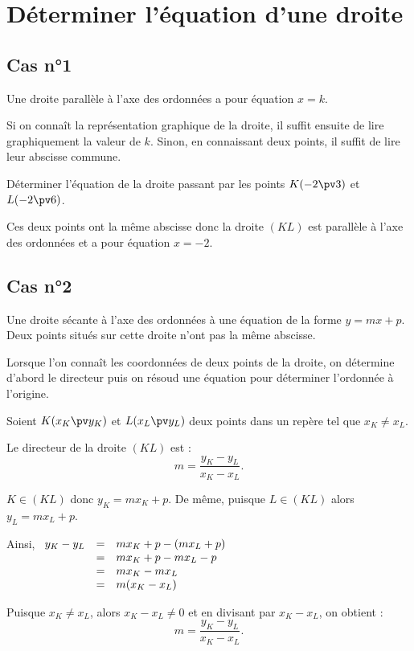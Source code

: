 \documentclass[10pt,openright,twoside,french]{book}
\begin{document}
\section{Déterminer l'équation d'une droite}
\subsection{Cas n°1}
Une droite parallèle à l'axe des ordonnées a pour équation $x = k$.\par
Si on connaît la représentation graphique de la droite, il suffit ensuite de lire graphiquement la valeur de $k$. Sinon, en connaissant deux points, il suffit de lire leur abscisse commune.\medskip

\begin{Exemple}
    Déterminer l'équation de la droite passant par les points $K(-2 \pv 3)$ et $L(-2 \pv 6)$.\par
    Ces deux points ont la même abscisse donc la droite $(KL)$ est parallèle à l'axe des ordonnées et a pour équation $x = -2$.
\end{Exemple}

\subsection{Cas n°2}
Une droite sécante à l'axe des ordonnées à une équation de la forme $y = mx + p$. Deux points situés sur cette droite n'ont pas la même abscisse.\par

Lorsque l'on connaît les coordonnées de deux points de la droite, on détermine d'abord le \coef directeur puis on résoud une équation pour déterminer l'ordonnée à l'origine.

\begin{Prop}
    Soient $K(x_K \pv y_K)$ et $L(x_L \pv y_L)$ deux points dans un repère tel que $x_K \neq x_L$.\par
    Le \coef directeur de la droite $(KL)$ est : \[m = \frac{y_K - y_L}{x_K - x_L}.\]
\end{Prop}\clearpage

\begin{Demo}
    $K \in (KL)$ donc $y_K = mx_K + p$. De même, puisque $L \in (KL)$ alors $y_L = mx_L + p$.\par
    Ainsi,
    $\begin{array}[t]{rcl}
        y_K - y_L & = & mx_K + p - (mx_L + p)\\ &=& mx_K + p - mx_L - p\\ &=& mx_K - mx_L\\ &=& m(x_K - x_L)\end{array}$\medskip

        Puisque $x_K \neq x_L$, alors $x_K - x_L \neq 0$ et en divisant par $x_K - x_L$, on obtient :
        \[m = \frac{y_K - y_L}{x_K - x_L}.\]
\end{Demo}
\end{document}
